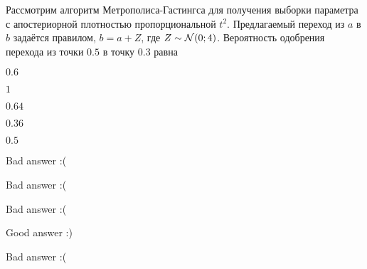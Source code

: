 
\begin{question}
Рассмотрим алгоритм Метрополиса-Гастингса для получения выборки
параметра с апостериорной плотностью пропорциональной \(t^2\).
Предлагаемый переход из \(a\) в \(b\) задаётся правилом, \(b = a + Z\),
где \(Z \sim \mathcal{N}(0;4)\). Вероятность одобрения перехода из точки \(0.5\)
в точку \(0.3\) равна
\begin{answerlist}
  \item \(0.6\)
  \item \(1\)
  \item \(0.64\)
  \item \(0.36\)
  \item \(0.5\)
\end{answerlist}
\end{question}

\begin{solution}
\begin{answerlist}
  \item Bad answer :(
  \item Bad answer :(
  \item Bad answer :(
  \item Good answer :)
  \item Bad answer :(
\end{answerlist}
\end{solution}

